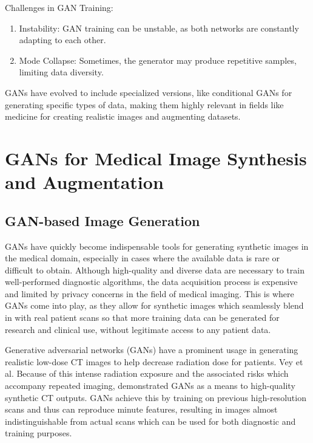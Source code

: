 \documentclass[12pt]{article}
\begin{document}
Challenges in GAN Training:
\begin{enumerate}

\item Instability: GAN training can be unstable, as both networks are constantly adapting to each other.
\item Mode Collapse: Sometimes, the generator may produce repetitive samples, limiting data diversity.

\end{enumerate}

GANs have evolved to include specialized versions, like conditional GANs for generating specific types of data, making them highly relevant in fields like medicine for creating realistic images and augmenting datasets.

\section{GANs for Medical Image Synthesis and Augmentation}
\subsection{GAN-based Image Generation}
GANs have quickly become indispensable tools for generating synthetic images in the medical domain, especially in cases where the available data is rare or difficult to obtain. Although high-quality and diverse data are necessary to train well-performed diagnostic algorithms, the data acquisition process is expensive and limited by privacy concerns in the field of medical imaging. This is where GANs come into play, as they allow for synthetic images which seamlessly blend in with real patient scans so that more training data can be generated for research and clinical use, without legitimate access to any patient data.

Generative adversarial networks (GANs) have a prominent usage in generating realistic low-dose CT images to help decrease radiation dose for patients. Vey et al. Because of this intense radiation exposure and the associated risks which accompany repeated imaging, \cite{Vey2019} demonstrated GANs as a means to high-quality synthetic CT outputs. GANs achieve this by training on previous high-resolution scans and thus can reproduce minute features, resulting in images almost indistinguishable from actual scans which can be used for both diagnostic and training purposes.
\end{document}
